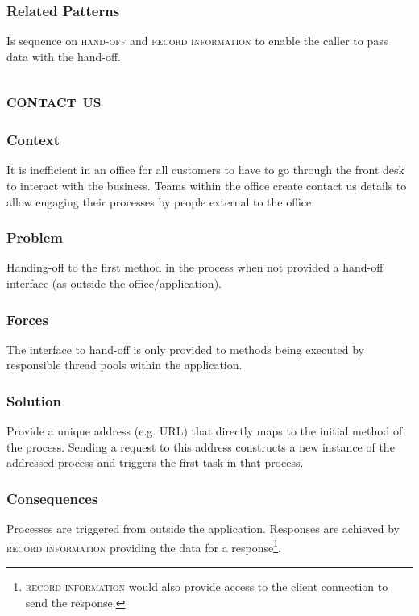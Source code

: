 \documentclass[prodmode]{style/acmlarge}
\begin{document}
\subsubsection*{Related Patterns} Is sequence on \textsc{hand-off} and
\textsc{record information} to enable the caller to pass data with the hand-off.



\subsection{\textsc{\textbf{contact us}}}

\subsubsection*{Context} It is inefficient in an office for all customers to
have to go through the front desk to interact with the business.  Teams within
the office create contact us details to allow engaging their processes by people
external to the office.

\subsubsection*{Problem} Handing-off to the first method in the process when not
provided a hand-off interface (as outside the office/application).

\subsubsection*{Forces} The interface to hand-off is only provided to methods
being executed by responsible thread pools within the application.

\subsubsection*{Solution} Provide a unique address (e.g. URL) that directly maps
to the initial method of the process.  Sending a request to this address
constructs a new instance of the addressed process and triggers the first task
in that process.

\subsubsection*{Consequences} Processes are triggered from outside the
application. Responses are achieved by \textsc{record information} providing the
data for a response\footnote{\textsc{record information} would also provide
access to the client connection to send the response.}.
\end{document}
